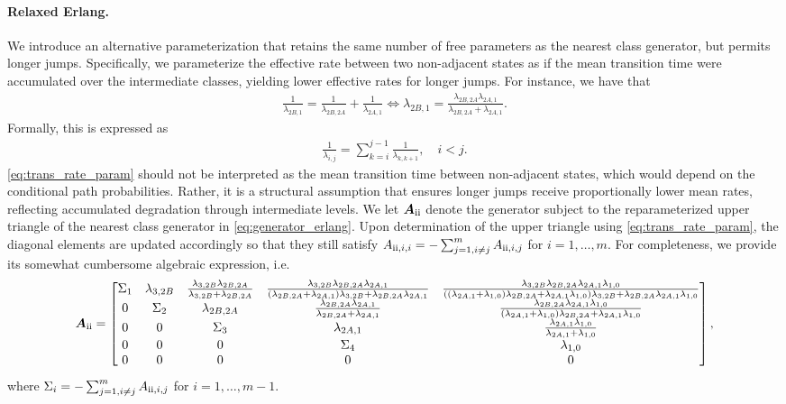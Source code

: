 \documentclass{article}
\newcommand{\RN}[1]{\textup{\uppercase\expandafter{\romannumeral#1}}}
\begin{document}
\paragraph{Relaxed Erlang.} 
We introduce an alternative parameterization that retains the same number of free parameters as the nearest class generator, but permits longer jumps. Specifically, we parameterize the effective rate between two non-adjacent states as if the mean transition time were accumulated over the intermediate classes, yielding lower effective rates for longer jumps.
For instance, we have that
\begin{align*}
    \frac{1}{\lambda_{2B, 1}} = \frac{1}{\lambda_{2B, 2A}} + \frac{1}{\lambda_{2A, 1}}
\iff \lambda_{2B,1} = \frac{\lambda_{2B, 2A} \lambda_{2A, 1}}{\lambda_{2B, 2A} + \lambda_{2A, 1}}. 
\end{align*}
Formally, this is expressed as
\begin{align}
    \frac{1}{\lambda_{i,j}} = \sum_{k = i}^{j-1} \frac{1}{\lambda_{k,k+1}}, \quad i < j. \label{eq:trans_rate_param}
\end{align}
\cref{eq:trans_rate_param} should not be interpreted as the mean transition time between non-adjacent states, which would depend on the conditional path probabilities. Rather, it is a structural assumption that ensures longer jumps receive proportionally lower mean rates, reflecting accumulated degradation through intermediate levels.
We let $\bm{A}_{\RN{2}}$ denote the generator subject to the reparameterized upper triangle of the nearest class generator in \cref{eq:generator_erlang}.
Upon determination of the upper triangle using \cref{eq:trans_rate_param}, the diagonal elements are updated accordingly so that they still satisfy $A_{\RN{2},i,i}= -\sum_{j=1, i \neq j}^m A_{\RN{2},i,j}$ for $i = 1, \dots, m$. For completeness, we provide its somewhat cumbersome algebraic expression, i.e.
\begin{align*}
  \bm{A}_{\RN{2}}=\begin{bmatrix}
\Sigma_1 & \lambda_{3,2B} & \frac{\lambda_{3,2B} \lambda_{2B,2A}}{\lambda_{3,2B}+\lambda_{2B,2A}} & \frac{\lambda_{3,2B} \lambda_{2B,2A} \lambda_{2A,1}}{\left(\lambda_{2B,2A}+\lambda_{2A,1}\right) \lambda_{3,2B}+\lambda_{2B,2A} \lambda_{2A,1}} & \frac{\lambda_{3,2B} \lambda_{2B,2A} \lambda_{2A,1} \lambda_{1,0}}{\left(\left(\lambda_{2A,1}+\lambda_{1,0}\right) \lambda_{2B,2A}+\lambda_{2A,1} \lambda_{1,0}\right) \lambda_{3,2B}+\lambda_{2B,2A} \lambda_{2A,1} \lambda_{1,0}} 
\\
 0 & 
 \Sigma_2 & \lambda_{2B,2A} & \frac{\lambda_{2B,2A} \lambda_{2A,1}}{\lambda_{2B,2A}+\lambda_{2A,1}} & \frac{\lambda_{2B,2A} \lambda_{2A,1} \lambda_{1,0}}{\left(\lambda_{2A,1}+\lambda_{1,0}\right) \lambda_{2B,2A}+\lambda_{2A,1} \lambda_{1,0}} 
\\
 0 & 0 & \Sigma_3 & \lambda_{2A,1} & \frac{\lambda_{2A,1} \lambda_{1,0}}{\lambda_{2A,1}+\lambda_{1,0}} 
\\
 0 & 0 & 0 & \Sigma_4 & \lambda_{1,0} 
\\
 0 & 0 & 0 & 0 & 0 
    \end{bmatrix},
\end{align*}
where $\Sigma_i = -\sum_{j=1, i \neq j}^m A_{\RN{2},i,j}$ for $i = 1, \dots, m-1$. 
\end{document}
